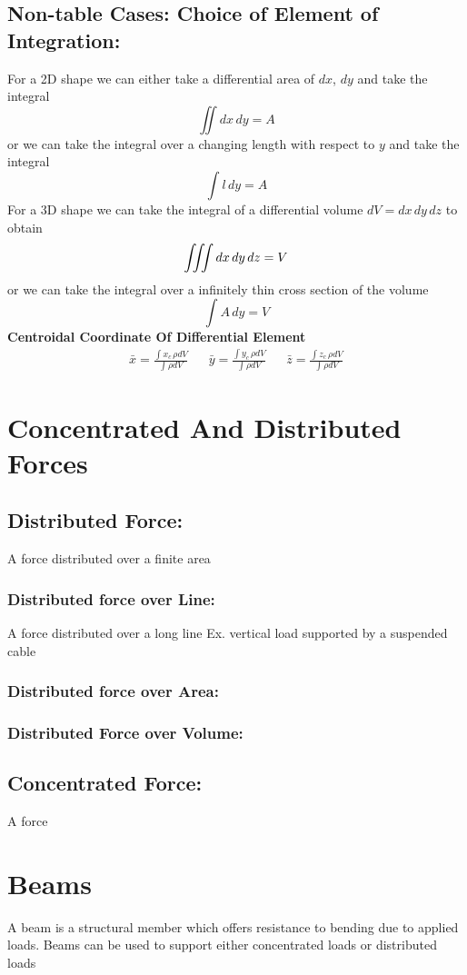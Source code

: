 \documentclass[14pt]{article}
\begin{document}
    \subsection{Non-table Cases: Choice of Element of Integration:}
    For a 2D shape we can either take a differential area of $dx$, $dy$ and take the integral
    $$\iint dx\, dy=A$$
    or we can take the integral over a changing length with respect to
    $y$ and take the integral
    $$\int l\, dy=A$$ For a 3D shape we can take the integral of a
    differential volume $dV=dx\, dy\, dz$ to obtain
    $$\iiint\\ dx\, dy\, dz=V$$ or we can take the integral over a
    infinitely thin cross section of the volume
    $$\int A\, dy=V$$
    \textbf{Centroidal Coordinate Of Differential Element}
    \begin{align*}
        \bar x=\frac{\int x_c\, \rho dV}{\int \rho dV}&& \bar y=\frac{\int y_c\, \rho dV}{\int \rho dV}&& \bar z=\frac{\int z_c\, \rho dV}{\int \rho dV}
    \end{align*}
    \section{Concentrated And Distributed Forces}
    \subsection{Distributed Force:}
    A force distributed over a finite area 
    \subsubsection{Distributed force over Line:}
    A force distributed over a long line Ex. vertical load supported by
    a suspended cable
    \subsubsection{Distributed force over Area:}
    \subsubsection{Distributed Force over Volume:}
    \subsection{Concentrated Force:}
    A force  
    \section{Beams}
    A beam is a structural member which offers resistance to bending due
    to applied loads. Beams can be used to support either concentrated
    loads or distributed loads 
\end{document}
